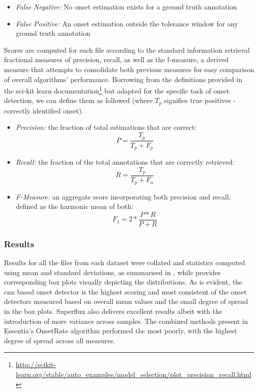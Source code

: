 \begin{itemize}
  \item \textit{False Negative:} No onset estimation exists for a ground truth annotation
  \item \textit{False Positive:} An onset estimation outside the tolerance window for any ground truth annotation
\end{itemize}

Scores are computed for each file according to the standard information retrieval fractional measures of precision, recall, as well as the f-measure, a derived measure that attempts to consolidate both previous measures for easy comparison of overall algorithms’ performance. Borrowing from the definitions provided in the sci-kit learn documentation\footnote{\url{http://scikit-learn.org/stable/auto_examples/model_selection/plot_precision_recall.html}} but adapted for the specific task of onset detection, we can define them as followed (where $T_p$ signifies true positives - correctly identified onset).

\begin{itemize}
  \item \textit{Precision:} the fraction of total estimations that are correct:
\begin{equation}
\label{eq:Precision}	
P=\frac{T_{p}}{T_{p}+F_{p}}
\end{equation}  

  \item \textit{Recall:} the fraction of the total annotations that are correctly retrieved:
\begin{equation}
\label{eq:Precision}	
R=\frac{T_{p}}{T_{p}+F_{n}}
\end{equation}  

  \item \textit{F-Measure:} an aggregate score incorporating both precision and recall, defined as the harmonic mean of both:
\begin{equation}
\label{eq:Precision}	
F_{1}=2*\frac{P*R}{P+R}
\end{equation}  

\end{itemize}

\subsubsection{Results}

Results for all the files from each dataset were collated and statistics computed using mean and standard deviations, as summarised in , while  provides corresponding box plots visually depicting the distributions. As is evident, the \acrfull{cnn} based onset detector is the highest scoring and most consistent of the onset detectors measured based on overall mean values and the small degree of spread in the box plots. Superflux also delivers excellent results albeit with the introduction of more variance across samples. The combined methods present in Essentia's OnsetRate algorithm performed the most poorly, with the highest degree of spread across all measures.

